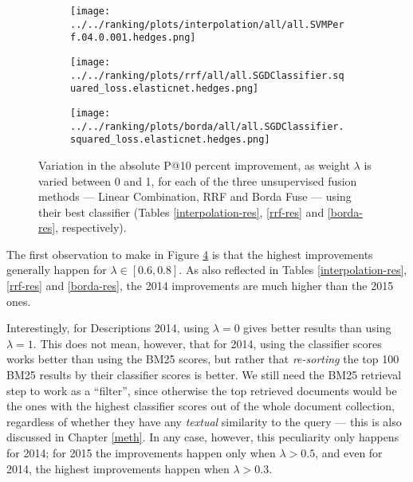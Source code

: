 \begin{figure}[h!]

\begin{subfigure}[b]{\textwidth}
 \centerline {
  \texttt{[image: ../../ranking/plots/interpolation/all/all.SVMPerf.04.0.001.hedges.png]}
  }
  \label{interp-weight}
\end{subfigure}
\begin{subfigure}[b]{\textwidth}
\centerline{
  \texttt{[image: ../../ranking/plots/rrf/all/all.SGDClassifier.squared\_loss.elasticnet.hedges.png]}
  }
  \label{rrf-weight}
\end{subfigure}
\begin{subfigure}[b]{\textwidth}
\centerline{
  \texttt{[image: ../../ranking/plots/borda/all/all.SGDClassifier.squared\_loss.elasticnet.hedges.png]}
  }
  \label{borda-weight}
\end{subfigure}

 \caption{Variation in the absolute P@10 percent improvement, as weight $\lambda$ is varied between 0 and 1, for each of the three unsupervised
fusion methods --- Linear Combination, RRF and Borda Fuse --- using their best classifier (Tables \ref{interpolation-res}, \ref{rrf-res}
and \ref{borda-res}, respectively).}
 \label{lambda-vary}

\end{figure}

The first observation to make in Figure \ref{lambda-vary} is that the highest improvements generally happen for $\lambda \in [0.6, 0.8]$.
As also reflected in Tables \ref{interpolation-res}, \ref{rrf-res} and \ref{borda-res}, the 2014 improvements are much higher than
the 2015 ones.

Interestingly, for Descriptions 2014, using $\lambda = 0$ gives better results
than using $\lambda=1$. This does not mean, however, that for 2014, using the classifier scores
works better than using the BM25 scores, but rather that
\emph{re-sorting} the top 100 BM25 results by their classifier scores is better.
We still need the BM25 retrieval step to work as a ``filter'',
since otherwise the top retrieved documents would be the ones with the highest classifier scores out of the whole document collection,
regardless of whether
they have any \emph{textual} similarity to the query --- this is also discussed in Chapter \ref{meth}.
In any case,  however, this peculiarity only happens for 2014; for 2015 the improvements happen only when $\lambda>0.5$,
and even for 2014, the highest improvements happen when $\lambda>0.3$.

